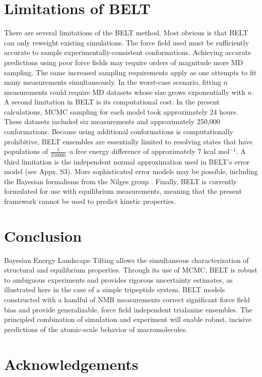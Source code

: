 \documentclass[11pt,titlepage]{article}
\begin{document}
\section*{Limitations of BELT}

There are several limitations of the BELT method.  Most obvious is that BELT can only reweight existing simulations.  The force field used must be sufficiently accurate to sample experimentally-consistent conformations.  Achieving accurate predictions using poor force fields may require orders of magnitude more MD sampling.  The same increased sampling requirements apply as one attempts to fit many measurements simultaneously.  In the worst-case scenario, fitting $n$ measurements could require MD datasets whose size grows exponentially with $n$.  A second limitation in BELT is its computational cost.  In the present calculations, MCMC sampling for each model took approximately 24 hours.  These datasets included six measurements and approximately 250,000 conformations.  Because using additional conformations is computationally prohibitive, BELT ensembles are essentially limited to resolving states that have populations of $\frac{1}{250000}$--a free energy difference of approximately $7$ kcal mol$^{-1}$.  A 
third limitation is the independent normal approximation used in BELT's error model (see Appx. S3).  More sophisticated error models may be possible, including the Bayesian formalisms from the Nilges group \citep{rieping2005, habeck2006, habeck2005bayesian}.  Finally, BELT is currently formulated for use with equilibrium measurements, meaning that the present framework cannot be used to predict kinetic properties.  

\section*{Conclusion}

Bayesian Energy Landscape Tilting allows the simultaneous characterization of structural and equilibrium properties.  Through its use of MCMC, BELT is robust to ambiguous experiments and provides rigorous uncertainty estimates, as illustrated here in the case of a simple tripeptide system.  BELT models constructed with a handful of NMR measurements correct significant force field bias and provide generalizable, force field independent trialanine ensembles.  The principled combination of simulation and experiment will enable robust, incisive predictions of the atomic-scale behavior of macromolecules.  


\section*{Acknowledgements}
\end{document}
